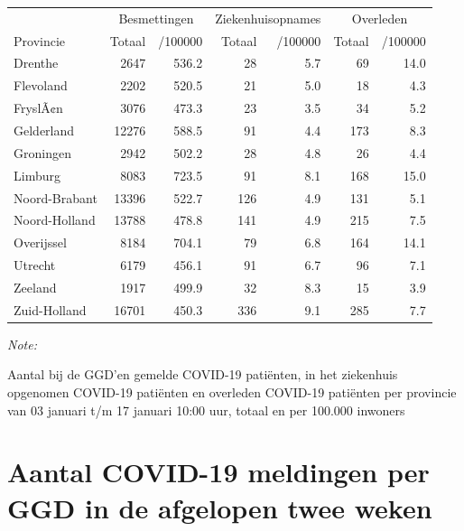\documentclass[
  english,
  man,floatsintext]{apa6}
\begin{document}
\begin{table}[H]
\centering
\begin{threeparttable}
\begin{tabular}{lrrrrrr}
\toprule
\multicolumn{1}{c}{ } & \multicolumn{2}{c}{Besmettingen} & \multicolumn{2}{c}{Ziekenhuisopnames} & \multicolumn{2}{c}{Overleden} \\
\cmidrule(l{3pt}r{3pt}){2-3} \cmidrule(l{3pt}r{3pt}){4-5} \cmidrule(l{3pt}r{3pt}){6-7}
Provincie & Totaal & /100000 & Totaal & /100000 & Totaal & /100000\\
\midrule
Drenthe & 2647 & 536.2 & 28 & 5.7 & 69 & 14.0\\
Flevoland & 2202 & 520.5 & 21 & 5.0 & 18 & 4.3\\
FryslÃ¢n & 3076 & 473.3 & 23 & 3.5 & 34 & 5.2\\
Gelderland & 12276 & 588.5 & 91 & 4.4 & 173 & 8.3\\
Groningen & 2942 & 502.2 & 28 & 4.8 & 26 & 4.4\\
Limburg & 8083 & 723.5 & 91 & 8.1 & 168 & 15.0\\
Noord-Brabant & 13396 & 522.7 & 126 & 4.9 & 131 & 5.1\\
Noord-Holland & 13788 & 478.8 & 141 & 4.9 & 215 & 7.5\\
Overijssel & 8184 & 704.1 & 79 & 6.8 & 164 & 14.1\\
Utrecht & 6179 & 456.1 & 91 & 6.7 & 96 & 7.1\\
Zeeland & 1917 & 499.9 & 32 & 8.3 & 15 & 3.9\\
Zuid-Holland & 16701 & 450.3 & 336 & 9.1 & 285 & 7.7\\
\bottomrule
\end{tabular}
\begin{tablenotes}
\item \textit{Note: } 
\item Aantal bij de GGD’en gemelde COVID-19 patiënten, in het ziekenhuis opgenomen COVID-19 patiënten en overleden COVID-19 patiënten per provincie van 03 januari t/m 17 januari 10:00 uur, totaal en per 100.000 inwoners
\end{tablenotes}
\end{threeparttable}
\end{table}

\newpage

\hypertarget{aantal-covid-19-meldingen-per-ggd-in-de-afgelopen-twee-weken}{%
\section{Aantal COVID-19 meldingen per GGD in de afgelopen twee weken}\label{aantal-covid-19-meldingen-per-ggd-in-de-afgelopen-twee-weken}}
\end{document}
